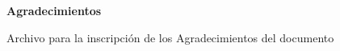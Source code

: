 \begin{center}
    \textbf{Agradecimientos}\par
\end{center}

Archivo para la inscripción de los Agradecimientos del documento